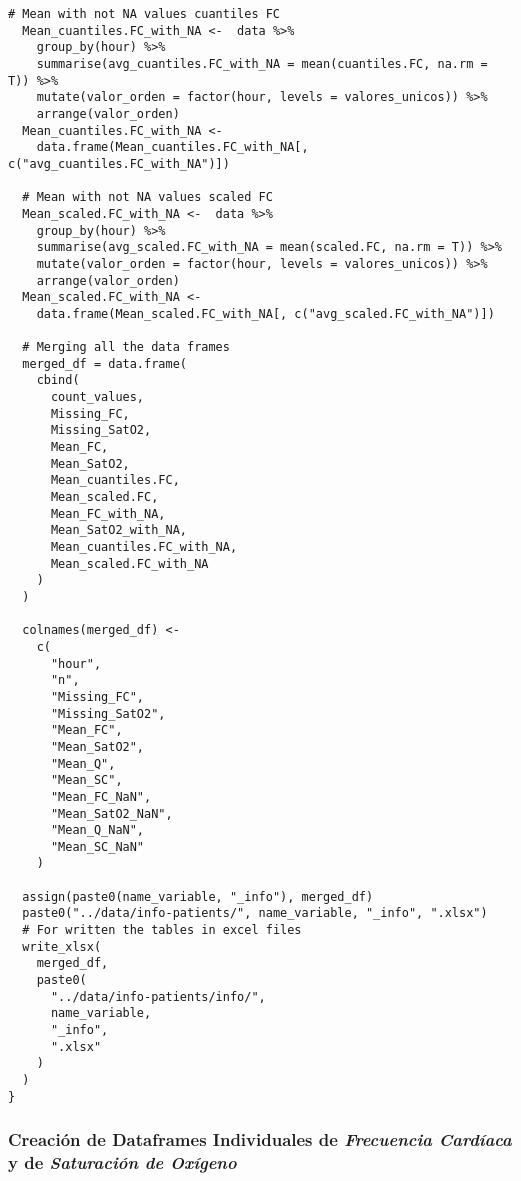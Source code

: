 \begin{lstlisting}[style=mystyle,caption={Cálculo de Medias y Cantidad de Valores Faltantes}, label={lst:medias-y-faltantes}]
  # Mean with not NA values cuantiles FC
  Mean_cuantiles.FC_with_NA <-  data %>%
    group_by(hour) %>%
    summarise(avg_cuantiles.FC_with_NA = mean(cuantiles.FC, na.rm = T)) %>%
    mutate(valor_orden = factor(hour, levels = valores_unicos)) %>%
    arrange(valor_orden)
  Mean_cuantiles.FC_with_NA <-
    data.frame(Mean_cuantiles.FC_with_NA[, c("avg_cuantiles.FC_with_NA")])
  
  # Mean with not NA values scaled FC
  Mean_scaled.FC_with_NA <-  data %>%
    group_by(hour) %>%
    summarise(avg_scaled.FC_with_NA = mean(scaled.FC, na.rm = T)) %>%
    mutate(valor_orden = factor(hour, levels = valores_unicos)) %>%
    arrange(valor_orden)
  Mean_scaled.FC_with_NA <-
    data.frame(Mean_scaled.FC_with_NA[, c("avg_scaled.FC_with_NA")])
  
  # Merging all the data frames
  merged_df = data.frame(
    cbind(
      count_values,
      Missing_FC,
      Missing_SatO2,
      Mean_FC,
      Mean_SatO2,
      Mean_cuantiles.FC,
      Mean_scaled.FC,
      Mean_FC_with_NA,
      Mean_SatO2_with_NA,
      Mean_cuantiles.FC_with_NA,
      Mean_scaled.FC_with_NA
    )
  )
  
  colnames(merged_df) <-
    c(
      "hour",
      "n",
      "Missing_FC",
      "Missing_SatO2",
      "Mean_FC",
      "Mean_SatO2",
      "Mean_Q",
      "Mean_SC",
      "Mean_FC_NaN",
      "Mean_SatO2_NaN",
      "Mean_Q_NaN",
      "Mean_SC_NaN"
    )
  
  assign(paste0(name_variable, "_info"), merged_df)
  paste0("../data/info-patients/", name_variable, "_info", ".xlsx")
  # For written the tables in excel files
  write_xlsx(
    merged_df,
    paste0(
      "../data/info-patients/info/",
      name_variable,
      "_info",
      ".xlsx"
    )
  )
}
\end{lstlisting}


\subsubsection{Creación de Dataframes Individuales de \textit{Frecuencia Cardíaca} y de \textit{Saturación de Oxígeno} }\label{sec:anexo2-dataframes}

